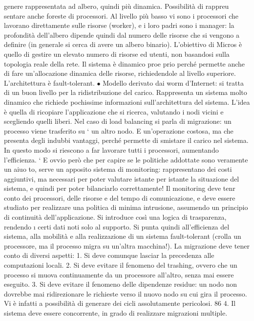 genere rappresentata ad albero, quindi più dinamica. Possibilità di rappreu
sentare anche foreste di processori. Al livello più basso vi sono i processori
che lavorano direttamente sulle risorse (worker), e i loro padri sono i manager: la profondità dell'albero dipende
quindi dal numero delle risorse che
si vengono a definire (in generale si cerca di avere un albero binario). L'obiettivo di Micros è quello di gestire un
elevato numero di risorse ed utenti,
non basandosi sulla topologia reale della rete. Il sistema è dinamico proe
prio perché permette anche di fare un'allocazione dinamica delle risorse,
richiedendole al livello superiore. L'architettura è fault-tolerant.
$\bullet$ Modello derivato dai worm d'Internet: si tratta di un buon livello per
la ridistribuzione del carico. Rappresenta un sistema molto dinamico che
richiede pochissime informazioni sull'architettura del sistema. L'idea è
quella di ricopiare l'applicazione che si ricerca, valutando i nodi vicini e
scegliendo quelli liberi.
Nel caso di load balancing si parla di migrazione: un processo viene trasferito su
`
un altro nodo. E un'operazione costosa, ma che presenta degli indubbi vantaggi,
perché permette di smistare il carico nel sistema. In questo modo si riescono a
far lavorare tutti i processori, aumentando l'efficienza.
`
E ovvio però che per capire se le politiche addottate sono veramente un aiuo
to, serve un apposito sistema di monitoring: rappresentano dei costi aggiuntivi,
ma necessari per poter valutare istante per istante la situazione del sistema, e
quindi per poter bilanciarlo correttamente! Il monitoring deve tenr conto dei
processori, delle risorse e del tempo di comunicazione, e deve essere studiato per
realizzare una politica di minima intrusione, assumendo un principio di continuità dell'applicazione. Si introduce così
una logica di trasparenza, rendendo
\i{}
certi dati noti solo al supporto. Si punta quindi all'efficienza del sistema, alla
mobilità e alla realizzazione di un sistema fault-tolerant (crolla un processore,
ma il processo migra su un'altra macchina!).
La migrazione deve tener conto di diversi aspetti:
1. Si deve comunque lasciar la precedenza alle computazioni locali.
2. Si deve evitare il fenomeno del trashing, ovvero che un processo si muova
continuamente da un processore all'altro, senza mai essere eseguito.
3. Si deve evitare il fenomeno delle dipendenze residue: un nodo non dovrebbe
mai ridirezionare le richieste verso il nuovo nodo su cui gira il processo.
Vi è infatti a possibilità di generare dei cicli assolutamente pericolosi.
86
4. Il sistema deve essere concorrente, in grado di realizzare migrazioni multiple.
